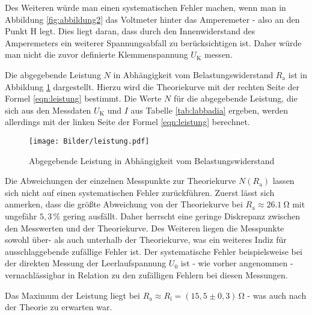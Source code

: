 Des Weiteren würde man einen systematischen Fehler machen, wenn man in Abbildung \ref{fig:abbildung2} das Voltmeter hinter das Amperemeter - also an den Punkt H legt.
Dies liegt daran, dass durch den Innenwiderstand des Amperemeters ein weiterer Spannungsabfall zu berücksichtigen ist. Daher würde man nicht die zuvor definierte Klemmenspannung $U_{\text{K}}$ messen.

Die abgegebende Leistung $N$ in Abhängigkeit vom Belastungswiderstand $R_{\text{a}}$ ist in Abbildung \ref{fig:aufe} dargestellt. 
Hierzu wird die Theoriekurve mit der rechten Seite der Formel \eqref{eqn:leistung} bestimmt.
Die Werte $N$ für die abgegebende Leistung, die sich aus den Messdaten $U_{\text{K}}$ und $I$ aus Tabelle \ref{tab:labbadia} ergeben, werden allerdings mit der linken Seite der Formel \eqref{eqn:leistung} berechnet.
\begin{figure}
\texttt{[image: Bilder/leistung.pdf]}
\caption{Abgegebende Leistung in Abhängigkeit vom Belastungswiderstand}
\label{fig:aufe}
\end{figure}

Die Abweichungen der einzelnen Messpunkte zur Theoriekurve $N(R_{\text{a}})$ lassen sich nicht auf einen systematischen Fehler zurückführen.
Zuerst lässt sich anmerken, dass die größte Abweichung von der Theoriekurve bei $R_{\text{a}} \approx \SI{26,1}{\ohm}$ mit ungefähr $5,3 \, \%$ gering ausfällt. Daher herrscht eine geringe Diskrepanz zwischen den Messwerten und der Theoriekurve.
Des Weiteren liegen die Messpunkte sowohl über- als auch unterhalb der Theoriekurve, was ein weiteres Indiz für ausschlaggebende zufällige Fehler ist.
Der systematische Fehler beispielsweise bei der direkten Messung der Leerlaufspannung $U_0$ ist - wie vorher angenommen - vernachlässigbar in Relation zu den zufälligen Fehlern bei diesen Messungen.

Das Maximum der Leistung liegt bei $R_{\text{a}} \approx R_{\text{i}} = (15,5 \pm 0,3) \, \si{\ohm}$ - was auch nach der Theorie zu erwarten war.

